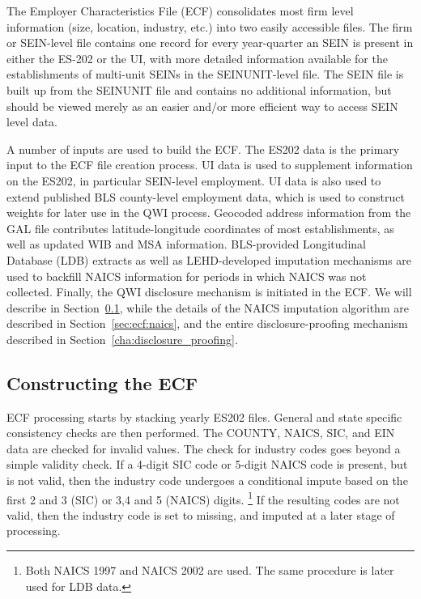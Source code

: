 
%
%

The Employer Characteristics File (ECF) consolidates most firm level
information (size, location, industry, etc.) into two easily accessible
files. The firm or SEIN-level file contains one record for every
year-quarter an SEIN is present in either the ES-202 or the UI, with more
detailed information available for the establishments of multi-unit SEINs in the 
SEINUNIT-level file. The SEIN file is built up from the SEINUNIT file and contains
no additional information, but should be viewed merely as an easier and/or
more efficient way to access SEIN level data.

A number of inputs are used to build the ECF. 
%
The ES202 data  is the primary input to the ECF file
creation process.  
%
UI data is  used to supplement information on the ES202,
in particular SEIN-level employment. UI data is also used to extend
published BLS county-level employment data, which is used to construct
weights for later use in the QWI process. Geocoded address information from the
%
GAL file contributes latitude-longitude coordinates of most
establishments, as well as updated WIB and MSA
information. 
%
BLS-provided Longitudinal Database (LDB) extracts as well as
LEHD-developed imputation mechanisms are used to backfill NAICS information
for periods in which NAICS was not collected. 
%
Finally, the QWI disclosure
mechanism is initiated in the ECF. 
%
We will describe in
Section~\ref{sec:ecf_processing}, while the details of the NAICS imputation
algorithm are described in Section~\ref{sec:ecf:naics}, and the entire
disclosure-proofing mechanism described in Section~\ref{cha:disclosure_proofing}.


\subsection{Constructing the ECF}
\label{sec:ecf_processing}


ECF processing starts by stacking yearly  ES202 files. 
General and state specific consistency checks are then performed.
The COUNTY, NAICS, SIC, and EIN data are checked for invalid values. The 
 check for industry codes goes beyond a simple validity check. If a
4-digit SIC code or 5-digit NAICS code is
present, but is not valid, then the industry code undergoes a conditional impute
based on the first 2 and 3 (SIC) or 3,4 and 5 (NAICS) digits.%
%
\footnote{Both NAICS 1997 and NAICS 2002 are used. The same procedure is
  later used for LDB data.}%
%
If the resulting codes are not valid, then the industry code is set to
missing, and  imputed at a later stage of processing.

